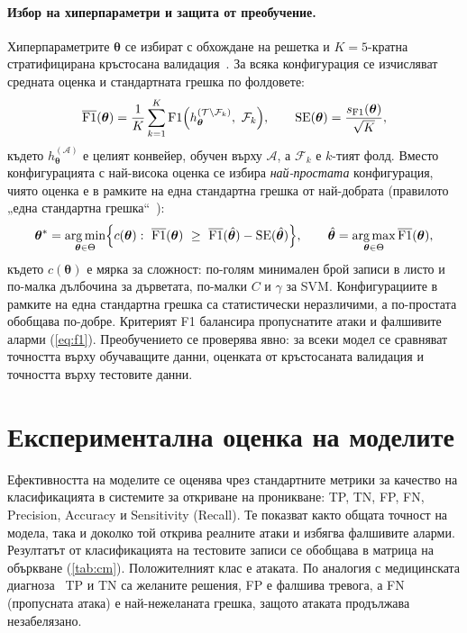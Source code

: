 \paragraph{Избор на хиперпараметри и защита от преобучение.} Хиперпараметрите $\bm{\theta}$ се избират с обхождане на решетка и $K=5$-кратна стратифицирана кръстосана валидация~\cite{kohavi1995}. За всяка конфигурация се изчисляват средната оценка и стандартната грешка по фолдовете:
\begin{equation}\label{eq:cv}
\overline{\operatorname{F1}}(\bm{\theta})=\frac{1}{K}\sum_{k=1}^{K}\operatorname{F1}\Bigl(h_{\bm{\theta}}^{(\mathcal{T}\setminus\mathcal{F}_k)},\ \mathcal{F}_k\Bigr),\qquad \operatorname{SE}(\bm{\theta})=\frac{s_{\operatorname{F1}}(\bm{\theta})}{\sqrt{K}},
\end{equation}
където $h_{\bm{\theta}}^{(\mathcal{A})}$ е целият конвейер, обучен върху $\mathcal{A}$, а $\mathcal{F}_k$ е $k$-тият фолд. Вместо конфигурацията с най-висока оценка се избира \emph{най-простата} конфигурация, чиято оценка е в рамките на една стандартна грешка от най-добрата (правилото „една стандартна грешка“~\cite{breiman1984,hastie2009}):
\begin{equation}\label{eq:one-se}
\bm{\theta}^{*}=\argmin_{\bm{\theta}\in\Theta}\Bigl\{c(\bm{\theta}):\ \overline{\operatorname{F1}}(\bm{\theta})\ \ge\ \overline{\operatorname{F1}}(\hat{\bm{\theta}})-\operatorname{SE}(\hat{\bm{\theta}})\Bigr\},\qquad \hat{\bm{\theta}}=\argmax_{\bm{\theta}\in\Theta}\overline{\operatorname{F1}}(\bm{\theta}),
\end{equation}
където $c(\bm{\theta})$ е мярка за сложност: по-голям минимален брой записи в листо и по-малка дълбочина за дърветата, по-малки $C$ и $\gamma$ за SVM. Конфигурациите в рамките на една стандартна грешка са статистически неразличими, а по-простата обобщава по-добре. Критерият F1 балансира пропуснатите атаки и фалшивите аларми (\cref{eq:f1}). Преобучението се проверява явно: за всеки модел се сравняват точността върху обучаващите данни, оценката от кръстосаната валидация и точността върху тестовите данни.

\section{Експериментална оценка на моделите}\label{sec:metrics}

Ефективността на моделите се оценява чрез стандартните метрики за качество на класификацията в системите за откриване на проникване: TP, TN, FP, FN, Precision, Accuracy и Sensitivity (Recall). Те показват както общата точност на модела, така и доколко той открива реалните атаки и избягва фалшивите аларми. Резултатът от класификацията на тестовите записи се обобщава в матрица на объркване (\cref{tab:cm}). Положителният клас е атаката. По аналогия с медицинската диагноза~\cite{borovska2022} TP и TN са желаните решения, FP е фалшива тревога, а FN (пропусната атака) е най-нежеланата грешка, защото атаката продължава незабелязано.

